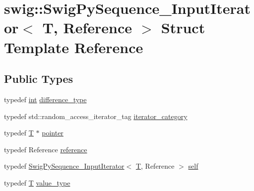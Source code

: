 \hypertarget{structswig_1_1_swig_py_sequence___input_iterator}{}\section{swig\+:\+:Swig\+Py\+Sequence\+\_\+\+Input\+Iterator$<$ T, Reference $>$ Struct Template Reference}
\label{structswig_1_1_swig_py_sequence___input_iterator}
\subsection*{Public Types}
\begin{DoxyCompactItemize}
\item 
typedef \hyperlink{lp__lib_8h_adeb9ec6400320e4923ac9d836d509ddb}{int} \hyperlink{structswig_1_1_swig_py_sequence___input_iterator_af5e5d3f2d1906ceaf05c2215ee388096}{difference\+\_\+type}
\item 
typedef std\+::random\+\_\+access\+\_\+iterator\+\_\+tag \hyperlink{structswig_1_1_swig_py_sequence___input_iterator_a39f1b5afee549aeb2f87c854c41be9c1}{iterator\+\_\+category}
\item 
typedef \hyperlink{fmt_8h_a0acb682b8260ab1c60b918599864e2e5}{T} $\ast$ \hyperlink{structswig_1_1_swig_py_sequence___input_iterator_ab026efc65329dff4b7af149da037209b}{pointer}
\item 
typedef Reference \hyperlink{structswig_1_1_swig_py_sequence___input_iterator_a75f82d558aaa6781b77d34914eb0f455}{reference}
\item 
typedef \hyperlink{structswig_1_1_swig_py_sequence___input_iterator}{Swig\+Py\+Sequence\+\_\+\+Input\+Iterator}$<$ \hyperlink{fmt_8h_a0acb682b8260ab1c60b918599864e2e5}{T}, Reference $>$ \hyperlink{structswig_1_1_swig_py_sequence___input_iterator_a3d3f028d1d9af412c61de2b5d8630321}{self}
\item 
typedef \hyperlink{fmt_8h_a0acb682b8260ab1c60b918599864e2e5}{T} \hyperlink{structswig_1_1_swig_py_sequence___input_iterator_ad7b3ca8f977dda776f80b7c2099cae2f}{value\+\_\+type}
\end{DoxyCompactItemize}
